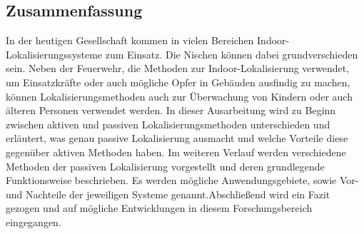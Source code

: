 \subsection*{Zusammenfassung}
\pagestyle{empty}
In der heutigen Gesellschaft kommen in vielen Bereichen Indoor-Lokalisierungssysteme zum Einsatz. Die Nischen können dabei grundverschieden sein. Neben der Feuerwehr, die Methoden zur Indoor-Lokalisierung verwendet, um Einsatzkräfte oder auch mögliche Opfer in Gebäuden ausfindig zu machen, können Lokalisierungsmethoden auch zur Überwachung von Kindern oder auch älteren Personen verwendet werden.\newline\newline
In dieser Ausarbeitung wird zu Beginn zwischen aktiven und passiven Lokalisierungsmethoden unterschieden und erläutert, was genau passive Lokalisierung ausmacht und welche Vorteile diese gegenüber aktiven Methoden haben. Im weiteren Verlauf werden verschiedene Methoden der passiven Lokalisierung vorgestellt und deren grundlegende Funktionsweise beschrieben. Es werden mögliche Anwendungsgebiete, sowie Vor- und Nachteile der jeweiligen Systeme genannt.\newline\newline Abschließend wird ein Fazit gezogen und auf mögliche Entwicklungen in diesem Forschungsbereich eingegangen. 